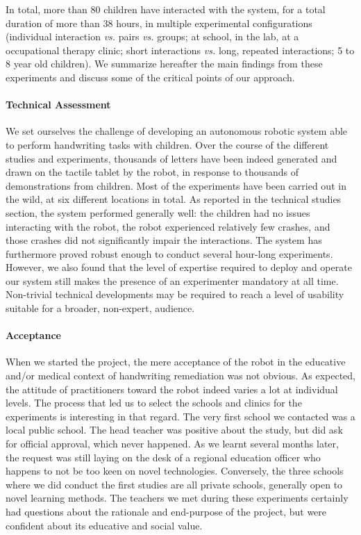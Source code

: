 \documentclass{article}
\newcommand{\vs}{\textit{vs.}\xspace}
\begin{document}
In total, more than 80 children have interacted with the system, for a total
duration of more than 38 hours, in multiple experimental configurations
(individual interaction \vs pairs \vs groups; at school, in the lab, at a
occupational therapy clinic; short interactions \vs long, repeated interactions; 5 to 8 year old
children). We summarize hereafter the main findings from these experiments and
discuss some of the critical points of our approach.

\paragraph{Technical Assessment} We set ourselves the challenge of developing an
autonomous robotic system able to perform handwriting tasks with children.
Over the course of the different studies and experiments, thousands of
letters have been indeed generated and drawn on the tactile tablet by the robot, in
response to thousands of demonstrations from children. Most of the experiments have been
carried out in the wild, at six different locations in total. As reported in the
technical studies section, the system performed generally well: the children had no
issues interacting with the robot, the robot experienced relatively few crashes,
and those crashes did not significantly impair the interactions. The system
has furthermore proved robust enough to conduct several hour-long experiments.
However, we also found that the level of expertise required to deploy and
operate our system still makes the presence of an experimenter mandatory at all
time. Non-trivial technical developments may be required to reach a level of
usability suitable for a broader, non-expert, audience.

\paragraph{Acceptance} When we started the project, the mere acceptance of the
robot in the educative and/or medical context of handwriting remediation was not
obvious. As expected, the attitude of practitioners toward the robot indeed
varies a lot at individual levels. The process that led us to select the schools
and clinics for the experiments is interesting in that regard. The very first
school we contacted was a local public school. The head teacher was positive
about the study, but did ask for official approval, which never happened. As we
learnt several months later, the request was still laying on the desk of a
regional education officer who happens to not be too keen on novel technologies.
Conversely, the three schools where we did conduct the first studies are all
private schools, generally open to novel learning methods. The teachers we met
during these experiments certainly had questions about the rationale and
end-purpose of the project, but were confident about its educative and social
value.
\end{document}
